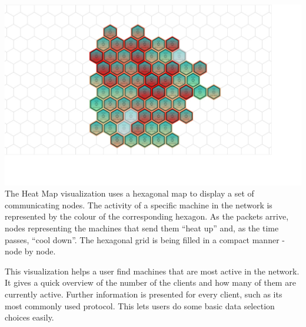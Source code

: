 \includegraphics[width=\linewidth]{materials/heat-map.jpg}
The Heat Map visualization uses a hexagonal map to display a set of communicating nodes.
The activity of a specific machine in the network is represented by the colour of the 
corresponding hexagon. As the packets arrive, nodes representing the machines that send them
``heat up'' and, as the time passes, ``cool down''. The hexagonal grid is being filled in a 
compact manner - node by node.

This visualization helps a user find machines that are most active in the network.
It gives a quick overview of the number of the clients and how many of them are currently active.
Further information is presented for every client, such as its most commonly used protocol. This lets users do some basic data selection choices easily.
